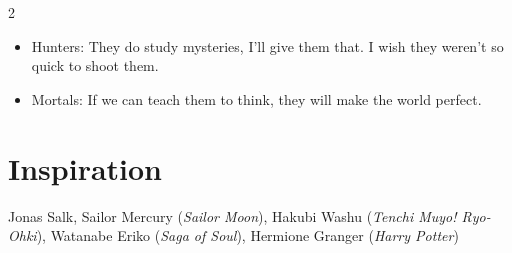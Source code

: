 \begin{multicols}{2}
\begin{itemize}
\item Hunters: They do study mysteries, I'll give them that. I wish they weren't so quick to shoot them.
\item Mortals: If we can teach them to think, they will make the world perfect.
\end{itemize}

\section*{Inspiration}
Jonas Salk, Sailor Mercury (\textit{Sailor Moon}), Hakubi Washu (\textit{Tenchi Muyo! Ryo-Ohki}), Watanabe Eriko (\textit{Saga of Soul}), Hermione Granger (\textit{Harry Potter})

\end{multicols}
